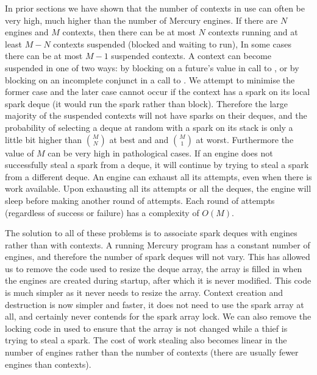 \begin{description}
    In prior sections
    we have shown that the number of contexts in use can often be very high,
    much higher than the number of Mercury engines.
    If there are $N$ engines and $M$ contexts,
    then there can be at most $N$ contexts running and
    at least $M-N$ contexts suspended (blocked and waiting to run),
    In some cases there can be at most $M-1$ suspended contexts.
    A context can become suspended in one of two ways:
    by blocking on a future's value in call to \wait,
    or by blocking on an incomplete conjunct in a call to \joinandcontinue.
    We attempt to minimise the former case and the later case cannot occur
    if the context has a spark on its local spark deque (it would run the
    spark rather than block).
    Therefore the large majority of the suspended contexts will not have
    sparks on their deques,
    and the probability of selecting a deque at random with a spark on its
    stack is only a little bit higher than $M \choose N$ at best and
    and $M \choose 1$ at worst.
    Furthermore the value of $M$ can be very high in pathological cases.
    If an engine does not successfully steal a spark from a deque,
    it will continue by trying to steal a spark from a different deque.
    An engine can exhaust all its attempts, even when there is work
    available.
    Upon exhausting all its attempts or all the deques,
    the engine will sleep before making another round of attempts.
    Each round of attempts (regardless of success or failure) has a
    complexity of $O(M)$.

\end{description}

\noindent
{}
The solution to all of these problems is to associate spark deques with
engines rather than with contexts.
A running Mercury program has a constant number of engines,
and therefore the number of spark deques will not vary.
This has allowed us to remove the code used to resize the deque array,
the array is filled in when the engines are created during startup,
after which it is never modified.
This code is much simpler as it never needs to resize the array.
Context creation and destruction is now simpler and faster,
it does not need to use the spark array at all, and certainly never contends
for the spark array lock.
We can also remove the locking code in \trystealspark used to ensure that
the array is not changed while a thief is trying to steal a spark.
The cost of work stealing also becomes linear in the number of engines
rather than the number of contexts (there are usually fewer engines than
contexts).

